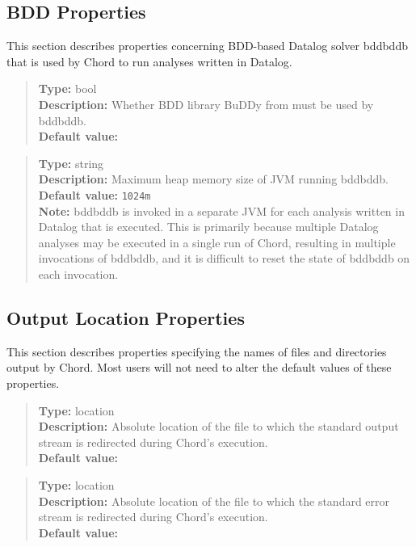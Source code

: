 \subsection{BDD Properties}
\label{sec:bdd-props}

This section describes properties concerning BDD-based Datalog solver bddbddb that is used by Chord to run analyses written in Datalog.
\\[10pt]

\begin{quote}
{\bf Type:} bool \\
{\bf Description:} Whether BDD library BuDDy from  must be used by bddbddb. \\
{\bf Default value:} 
\end{quote}

\begin{quote}
{\bf Type:} string \\
{\bf Description:} Maximum heap memory size of JVM running bddbddb. \\
{\bf Default value:} {\tt 1024m} \\
{\bf Note:} bddbddb is invoked in a separate JVM for each analysis written in Datalog that is executed.
This is primarily because multiple Datalog analyses may be executed in a single run of Chord,
resulting in multiple invocations of bddbddb, and it is difficult to reset the state of bddbddb on each invocation. 
\end{quote}

\subsection{Output Location Properties}
\label{sec:output-props}

This section describes properties specifying the names of files and directories output by Chord.
Most users will not need to alter the default values of these properties.
\\[10pt]

\begin{quote}
{\bf Type:} location \\
{\bf Description:} Absolute location of the file to which the standard output stream is redirected during Chord's execution. \\
{\bf Default value:} 
\end{quote}

\begin{quote}
{\bf Type:} location  \\
{\bf Description:} Absolute location of the file to which the standard error stream is redirected during Chord's execution. \\
{\bf Default value:} 
\end{quote}

